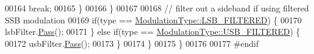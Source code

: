 \begin{DoxyCode}
00164                     \textcolor{keywordflow}{break};
00165             \}
00166         \}
00167 
00168         \textcolor{comment}{// filter out a sideband if using filtered SSB modulation}
00169         \textcolor{keywordflow}{if}(type == \hyperlink{namespaceradio_a46fb7299001138f28b7f69975c58399eaa6fd9ffa81c9d5e4a255b0c3b2336bd8}{ModulationType::LSB\_FILTERED}) \{
00170             lsbFilter.\hyperlink{classradio_1_1Filter_ad2793821801780809af385463bf8f197}{Pass}();
00171         \} \textcolor{keywordflow}{else} \textcolor{keywordflow}{if}(type == \hyperlink{namespaceradio_a46fb7299001138f28b7f69975c58399ea9d8eca0470206cddb0dd0297717eb876}{ModulationType::USB\_FILTERED}) \{
00172             usbFilter.\hyperlink{classradio_1_1Filter_ad2793821801780809af385463bf8f197}{Pass}();
00173         \}
00174     \}
00175 \}
00176 
00177 \textcolor{preprocessor}{#endif}
\end{DoxyCode}
